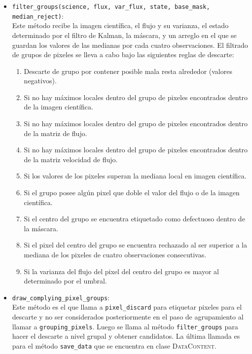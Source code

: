 \begin{itemize}
\item \texttt{filter\_groups(science, flux, var\_flux, state, base\_mask, median\_reject)}:\\
Este m\'etodo recibe la imagen cient\'ifica, el flujo y su varianza, el estado determinado por el filtro de Kalman, la m\'ascara, y un arreglo en el que se guardan los valores de las medianas por cada cuatro observaciones. 
El filtrado de grupos de pixeles se lleva a cabo bajo las siguientes reglas de descarte: 

\begin{enumerate}
\item Descarte de grupo por contener posible mala resta alrededor (valores negativos).  
\item	Si no hay m\'aximos locales dentro del grupo de pixeles encontrados dentro de la imagen cient\'ifica.
\item	Si no hay m\'aximos locales dentro del grupo de pixeles encontrados dentro de la matriz de flujo.
\item	Si no hay m\'aximos locales dentro del grupo de pixeles encontrados dentro de la matriz velocidad de flujo.
\item 	Si los valores de los pixeles superan la mediana local en imagen cient\'ifica.
\item	Si el grupo posee alg\'un pixel que doble el valor del flujo o de la imagen cient\'ifica.
\item	Si el centro del grupo se encuentra etiquetado como defectuoso dentro de la m\'ascara.
\item	Si el pixel del centro del grupo se encuentra rechazado al ser superior a la mediana de los pixeles de cuatro observaciones consecutivas.
\item	Si la varianza del flujo del pixel del centro del grupo es mayor al determinado por el umbral.
\end{enumerate} 
\item \texttt{draw\_complying\_pixel\_groups}:\\
Este m\'etodo es el que llama a \texttt{pixel\_discard} para etiquetar pixeles para el descarte y no ser considerados posteriormente en el paso de agrupamiento al llamar a \texttt{grouping\_pixels}. Luego se llama al m\'etodo \texttt{filter\_groups} para hacer el descarte a nivel grupal y obtener candidatos. La \'ultima llamada es para el m\'etodo \texttt{save\_data} que se encuentra en clase \textsc{DataContent}. 
\end{itemize}

